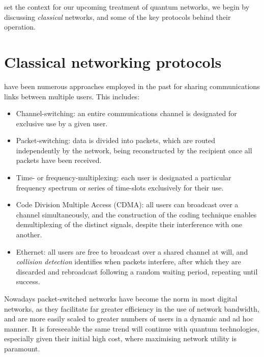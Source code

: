 %
%

 set the context for our upcoming treatment of quantum networks, we begin by discussing \textit{classical} networks, and some of the key protocols behind their operation.

\section{Classical networking protocols} \label{sec:classical_nets} 

 have been numerous approaches employed in the past for sharing communications links between multiple users. This includes:
\begin{itemize}
	\item Channel-switching: an entire communications channel is designated for exclusive use by a given user. 
	\item Packet-switching: data is divided into packets, which are routed independently by the network, being reconstructed by the recipient once all packets have been received.
	\item Time- or frequency-multiplexing: each user is designated a particular frequency spectrum or series of time-slots exclusively for their use. 
	\item Code Division Multiple Access (CDMA): all users can broadcast over a channel simultaneously, and the construction of the coding technique enables demultiplexing of the distinct signals, despite their interference with one another.
	\item Ethernet: all users are free to broadcast over a shared channel at will, and \textit{collision detection} identifies when packets interfere, after which they are discarded and rebroadcast following a random waiting period, repeating until success.
\end{itemize}

Nowadays packet-switched networks have become the norm in most digital networks, as they facilitate far greater efficiency in the use of network bandwidth, and are more easily scaled to greater numbers of users in a dynamic and ad hoc manner. It is foreseeable the same trend will continue with quantum technologies, especially given their initial high cost, where maximising network utility is paramount.

